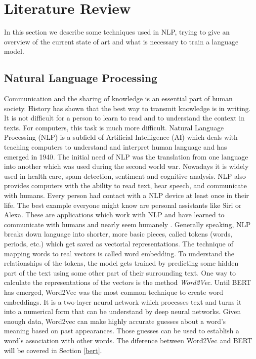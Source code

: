 \chapter{Literature Review} \label{chapter:literaturereview}
In this section we describe some techniques used in NLP, trying to give an overview of the current state of art and what is necessary to train a language model.

\section{Natural Language Processing}
Communication and the sharing of knowledge is an essential part of human society. History has shown that the best way to transmit knowledge is in writing. It is not difficult for a person to learn to read and to understand the context in texts. For computers, this task is much more difficult. Natural Language Processing (NLP) is a subfield of Artificial Intelligence (AI) which deals with teaching computers to understand and interpret human language and has emerged in 1940. The initial need of NLP was the translation from one language into another which was used during the second world war. Nowadays it is widely used in health care, spam detection, sentiment and cognitive analysis. NLP also provides computers with the ability to read text, hear speech, and communicate with humans. Every person had contact with a NLP device at least once in their life. The best example everyone might know are personal assistants like Siri or Alexa. These are applications which work with NLP and have learned to communicate with humans and nearly seem humanely \cite{Khurana}.\newline
Generally speaking, NLP breaks down language into shorter, more basic pieces, called tokens (words, periods, etc.) which get saved as vectorial representations. The technique of mapping words to real vectors is called word embedding. To understand the relationships of the tokens, the model gets trained by predicting some hidden part of the text using some other part of their surrounding text. One way to calculate the representations of the vectors is the method \textit{Word2Vec}. Until BERT has emerged, Word2Vec was the most common technique to create word embeddings. It is a two-layer neural network which processes text and turns it into a numerical form that can be understand by deep neural networks. Given enough data, Word2vec can make highly accurate guesses about a word’s meaning based on past appearances. Those guesses can be used to establish a word’s association with other words. The diference between Word2Vec and BERT will be covered in Section \ref{bert}.

